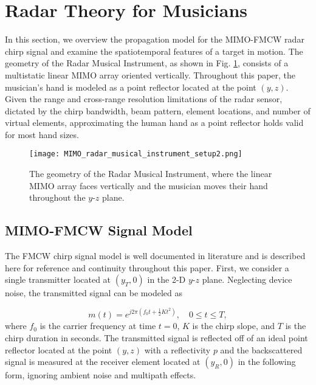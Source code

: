 \documentclass[10pt,journal,final]{IEEEtran}
\begin{document}
\section{Radar Theory for Musicians}
\label{sec:radar_theory_for_musicians}
In this section, we overview the propagation model for the MIMO-FMCW radar chirp signal and examine the spatiotemporal features of a target in motion. The geometry of the Radar Musical Instrument, as shown in Fig. \ref{fig:MIMO_radar_musical_instrument_setup}, consists of a multistatic linear MIMO array oriented vertically. Throughout this paper, the musician's hand is modeled as a point reflector located at the point $(y,z)$. Given the range and cross-range resolution limitations of the radar sensor, dictated by the chirp bandwidth, beam pattern, element locations, and number of virtual elements, approximating the human hand as a point reflector holds valid for most hand sizes.

\begin{figure}[h]
	\centering
	\texttt{[image: MIMO\_radar\_musical\_instrument\_setup2.png]}
	\caption{The geometry of the Radar Musical Instrument, where the linear MIMO array faces vertically and the musician moves their hand throughout the $y$-$z$ plane.}
	\label{fig:MIMO_radar_musical_instrument_setup}
\end{figure} 

\subsection{MIMO-FMCW Signal Model}
\label{subsec:signal_model}
The FMCW chirp signal model is well documented in literature \cite{josiah:isar} and is described here for reference and continuity throughout this paper. First, we consider a single transmitter located at $(y_T,0)$ in the 2-D $y$-$z$ plane. Neglecting device noise, the transmitted signal can be modeled as

\begin{equation}
	m(t) = e^{j2\pi(f_0t + \frac{1}{2}Kt^2)}, \quad 0 \leq t \leq T,
\end{equation}
where $f_0$ is the carrier frequency at time $t = 0$, $K$ is the chirp slope, and $T$ is the chirp duration in seconds.
The transmitted signal is reflected off of an ideal point reflector located at the point $(y,z)$ with a reflectivity $p$ and the backscattered signal is measured at the receiver element located at $(y_R,0)$ in the following form, ignoring ambient noise and multipath effects.
\end{document}
